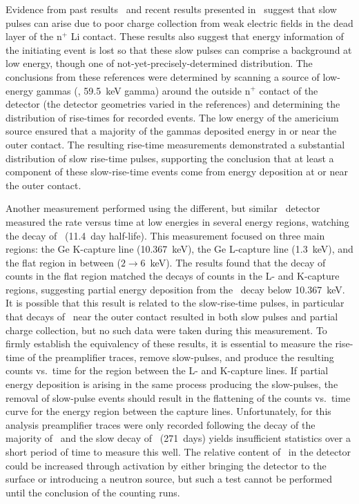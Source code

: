 Evidence from past results~\cite{Strauss196780,Sakai:1971ff} and recent results presented in~\cite{Aalseth:2010aa} suggest that slow pulses can arise due to poor charge collection from weak electric fields in the dead layer of the n$^{+}$ Li contact.  These results also suggest that energy information of the initiating event is lost so that these slow pulses can comprise a background at low energy, though one of not-yet-precisely-determined distribution.  The conclusions from these references were determined by scanning a source of low-energy gammas (\amtwofourone, 59.5~keV gamma) around the outside n$^{+}$ contact of the detector (the detector geometries varied in the references) and determining the distribution of rise-times for recorded events.  The low energy of the americium source ensured that a majority of the gammas deposited energy in or near the outer contact.  The resulting rise-time measurements demonstrated a substantial distribution of slow rise-time pulses, supporting the conclusion that at least a component of these slow-rise-time events come from energy deposition at or near the outer contact.  

Another measurement performed using the different, but similar \ppc~detector~\cite{Barbeau:2009fk} measured the rate versus time at low energies in several energy regions, watching the decay of \gersevenone~(11.4~day half-life).  This measurement focused on three main regions: the Ge K-capture line (10.367~keV), the Ge L-capture line (1.3~keV), and the flat region in between ($2\to6$~keV).  The results found that the decay of counts in the flat region matched the decays of counts in the L- and K-capture regions, suggesting partial energy deposition from the \gersevenone~decay below 10.367~keV.  It is possible that this result is related to the slow-rise-time pulses, in particular that decays of \gersevenone~near the outer contact resulted in both slow pulses and partial charge collection, but no such data were taken during this measurement.  To firmly establish the equivalency of these results, it is essential to measure the rise-time of the preamplifier traces, remove slow-pulses, and produce the resulting counts vs.~time for the region between the L- and K-capture lines.  If partial energy deposition is arising in the same process producing the slow-pulses, the removal of slow-pulse events should result in the flattening of the counts vs.~time curve for the energy region between the capture lines.  Unfortunately, for this analysis preamplifier traces were only recorded following the decay of the majority of \gersevenone~and the slow decay of \gersixeight~(271~days) yields insufficient statistics over a short period of time to measure this well.  The relative content of \gersevenone~in the detector could be increased through activation by either bringing the detector to the surface or introducing a neutron source, but such a test cannot be performed until the conclusion of the counting runs.  

